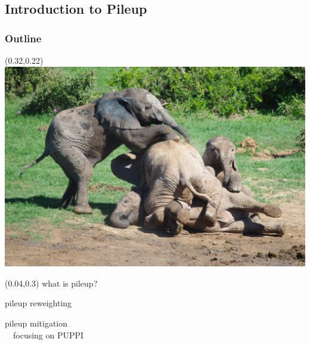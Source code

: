 
\subsection{Introduction to Pileup}
\begin{frame}[t]\frametitle{Outline}
    \begin{textblock}{0.65}(0.32,0.22)
    	\includegraphics[width=\textwidth]{images/pileup/Elephant-Pile-Up.jpg}
    \end{textblock}

    \begin{textblock}{0.25}(0.04,0.3)
    	what is pileup?
    	\vspace*{1cm}

    	pileup reweighting
		\vspace*{1cm}

    	pileup mitigation\\~~focusing on PUPPI
    \end{textblock}
\end{frame}


